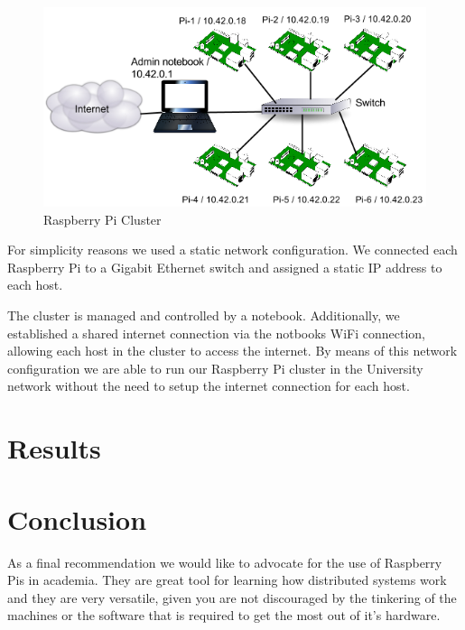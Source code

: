 \documentclass[10pt,a4paper]{article}
\begin{document}
\begin{figure}[!htb]
\includegraphics[scale=0.45]{png/pi_cluster.png} 
\centering
\caption{Raspberry Pi Cluster}
\end{figure}
For simplicity reasons we used a static network configuration. We connected each Raspberry Pi to a Gigabit Ethernet switch and assigned a static IP address to each host. 

The cluster is managed and controlled by a notebook. Additionally, we established a shared internet connection via the notbooks WiFi connection, allowing each host in the cluster to access the internet. 
By means of this network configuration we are able to run our Raspberry Pi cluster in the University network without the need to setup the internet connection for each host.


\section{Results}
\section{Conclusion}

As a final recommendation we would like to advocate for the use of Raspberry Pis in academia. They are great tool for learning how distributed systems work and they are very versatile, given you are not discouraged by the tinkering of the machines or the software that is required to get the most out of it's hardware.


\newpage
{}


\nocite{*}
\end{document}
